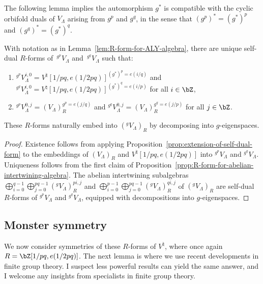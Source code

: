 The following lemma implies the automorphism $g^*$ is compatible with the cyclic orbifold duals of $V_\Lambda$ arising from $g^p$ and $g^q$, in the sense that $(g^p)^* = (g^*)^p$ and $(g^q)^* = (g^*)^q$.

\begin{lem} \label{lem:R-forms-for-prime-order-orbifold}
With notation as in Lemma~{\rm \ref{lem:R-form-for-ALY-algebra}}, there are unique self-dual $R$-forms of~${}^{g^p}V_\Lambda$ and~${}^{g^q}V_\Lambda$ such that:
\begin{enumerate}\itemsep=0pt
\item[$1)$] ${}^{g^p}V_\Lambda^{i,0} = V^\natural[1/pq,e(1/2pq)]^{(g^*)^p = e(i/q)}$ and ${}^{g^q}V_\Lambda^{i,0} = V^\natural[1/pq,e(1/2pq)]^{(g^*)^q = e(i/p)}$ for all $i \in \bZ$,
\item[$2)$] ${}^{g^p}V_\Lambda^{0,j} = (V_\Lambda)_R^{g^p = e(j/q)}$ and ${}^{g^q}V_\Lambda^{0,j} = (V_\Lambda)_R^{g^q = e(j/p)}$ for all $j \in \bZ$.
\end{enumerate}
These $R$-forms naturally embed into $({}^g V_\Lambda)_R$ by decomposing into $g$-eigenspaces.
\end{lem}
\begin{proof}Existence follows from applying Proposition~\ref{prop:extension-of-self-dual-form} to the embeddings of $(V_\Lambda)_R$ and $V^\natural[1/pq,e(1/2pq)]$ into ${}^{g^p}V_\Lambda$ and ${}^{g^q}V_\Lambda$. Uniqueness follows from the first claim of Proposition~\ref{prop:R-form-for-abelian-intertwining-algebra}. The abelian intertwining subalgebras $\bigoplus_{i=0}^{q-1} \bigoplus_{j=0}^{pq-1} ({}^gV_\Lambda)_R^{pi,j}$ and $\bigoplus_{i=0}^{p-1} \bigoplus_{j=0}^{pq-1} ({}^gV_\Lambda)_R^{qi,j}$ of $({}^g V_\Lambda)_R$ are self-dual $R$-forms of ${}^{g^p}V_\Lambda$ and ${}^{g^q}V_\Lambda$, equipped with decompositions into $g$-eigen\-spa\-ces.
\end{proof}

\subsection{Monster symmetry}

We now consider symmetries of these $R$-forms of $V^\natural$, where once again $R = \bZ[1/pq, e(1/2pq)]$. The next lemma is where we use recent developments in finite group theory. I suspect less powerful results can yield the same answer, and I welcome any insights from specialists in finite group theory.

